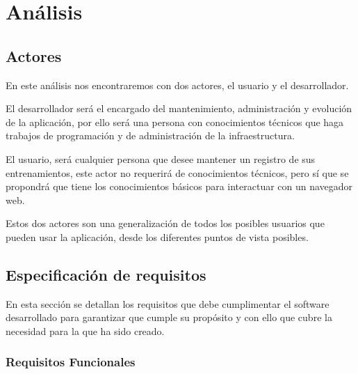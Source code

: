\chapter{Análisis}

\section {Actores}
En este análisis nos encontraremos con dos actores, el usuario y el desarrollador.

El desarrollador será el encargado del mantenimiento, administración y evolución de la aplicación, por ello será una persona con conocimientos técnicos que haga trabajos de programación y de administración de la infraestructura.

El usuario, será cualquier persona que desee mantener un registro de sus entrenamientos, este actor no requerirá de conocimientos técnicos, pero sí que se propondrá que tiene los conocimientos básicos para interactuar con un navegador web.

Estos dos actores son una generalización de todos los posibles usuarios que pueden usar la aplicación, desde los diferentes puntos de vista posibles.

\section{Especificación de requisitos}

En esta sección se detallan los requisitos que debe cumplimentar el software desarrollado para garantizar que cumple su propósito y con ello que cubre la necesidad para la que ha sido creado.

\subsection{Requisitos Funcionales}

